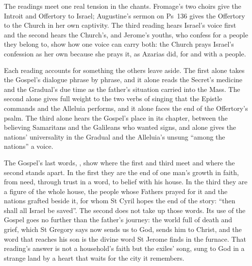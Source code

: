 The readings meet one real tension in the chants. Fromage's two choirs give the
Introit and Offertory to Israel; Augustine's sermon on Ps~136 gives the
Offertory to the Church in her own captivity. The third reading hears Israel's
voice first and the second hears the Church's, and Jerome's youths, who confess
for a people they belong to, show how one voice can carry both: the Church
prays Israel's confession as her own because she prays it, as Azarias did, for
and with a people.

Each reading accounts for something the others leave aside. The first alone
takes the Gospel's dialogue phrase by phrase, and it alone reads the Secret's
medicine and the Gradual's due time as the father's situation carried into the
Mass. The second alone gives full weight to the two verbs of singing that the
Epistle commands and the Alleluia performs, and it alone faces the end of the
Offertory's psalm. The third alone hears the
Gospel's place in its chapter, between the believing Samaritans and the
Galileans who wanted signs, and alone gives the nations' universality in the
Gradual and the Alleluia's unsung ``among the nations'' a voice.

The Gospel's last words, , show
where the first and third meet and where the second stands apart. In the first
they are the end of one man's growth in faith, from need, through trust in a
word, to belief with his house. In the third they are a figure of the whole
house, the people whose Fathers prayed for it and the nations grafted beside it,
for whom St Cyril hopes the end of the story: ``then shall all Israel be
saved''. The second does not take up those words. Its use of the Gospel goes
no further than the father's journey: the world full of death and grief, which
St Gregory says now sends us to God, sends him to Christ, and the word that
reaches his son is the divine word St Jerome finds in the furnace. That
reading's answer is not a household's faith but the exiles' song, sung to God
in a strange land by a heart that waits for the city it remembers.
